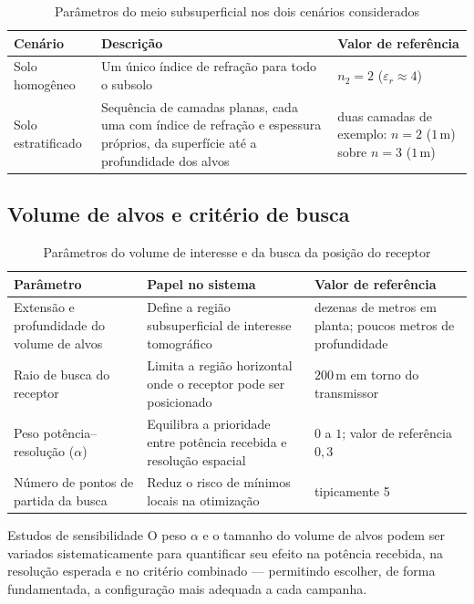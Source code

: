 \documentclass[11pt,a4paper]{article}
\newcommand{\alphaR}{\alpha}
\begin{document}
\begin{table}[H]
\centering
\caption{Parâmetros do meio subsuperficial nos dois cenários considerados}
\label{tab:soil_params}
\small
\begin{tabular}{@{}p{4.6cm}p{6.6cm}p{2.8cm}@{}}
\toprule
Cenário & Descrição & Valor de referência \\
\midrule
Solo homogêneo & Um único índice de refração para todo o subsolo & $n_2=2$ ($\varepsilon_r\approx4$) \\
Solo estratificado & Sequência de camadas planas, cada uma com índice de refração e espessura próprios, da superfície até a profundidade dos alvos & duas camadas de exemplo: $n{=}2$ ($1\,\text{m}$) sobre $n{=}3$ ($1\,\text{m}$) \\
\bottomrule
\end{tabular}
\normalsize
\end{table}

\subsection{Volume de alvos e critério de busca}

\begin{table}[H]
\centering
\caption{Parâmetros do volume de interesse e da busca da posição do receptor}
\label{tab:opt_params}
\small
\begin{tabular}{@{}p{4.6cm}p{6.6cm}p{2.8cm}@{}}
\toprule
Parâmetro & Papel no sistema & Valor de referência \\
\midrule
Extensão e profundidade do volume de alvos & Define a região subsuperficial de interesse tomográfico & dezenas de metros em planta; poucos metros de profundidade \\
Raio de busca do receptor & Limita a região horizontal onde o receptor pode ser posicionado & $200\,\text{m}$ em torno do transmissor \\
Peso potência--resolução ($\alphaR$) & Equilibra a prioridade entre potência recebida e resolução espacial & $0$ a $1$; valor de referência $0{,}3$ \\
Número de pontos de partida da busca & Reduz o risco de mínimos locais na otimização & tipicamente 5 \\
\bottomrule
\end{tabular}
\normalsize
\end{table}

\begin{nota}{Estudos de sensibilidade}
O peso $\alphaR$ e o tamanho do volume de alvos podem ser variados sistematicamente para
quantificar seu efeito na potência recebida, na resolução esperada e no critério combinado —
permitindo escolher, de forma fundamentada, a configuração mais adequada a cada campanha.
\end{nota}
\end{document}
